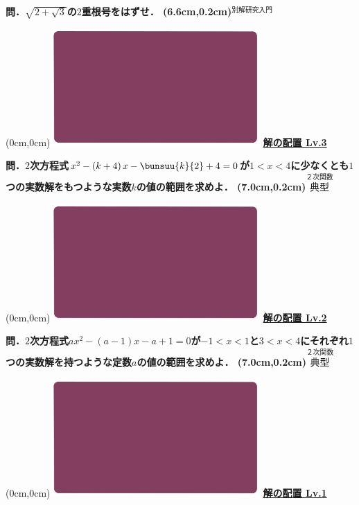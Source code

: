 \documentclass[10pt,
fleqn,
dvipdfmx,
uplatex
]{jsarticle}
\begin{document}
\HUGE 
\bf\boldmath 問．$\sqrt {2+\sqrt 3}$の$2$重根号をはずせ．
\at(6.6cm,0.2cm){\small\color{bradorange}$\overset{\text{別解研究入門}}{\text{}}$}


\newpage



\at(0cm,0cm){\includegraphics[width=8cm,bb=0 0 1920 1080]{./youtube/thumbnails/templates/smart_background/２次関数.jpeg}}
{\color{orange}\bf\boldmath\huge\underline{解の配置 Lv.3 }}\vspace{0.3zw}

\LARGE 
\bf\boldmath 問．$2$次方程式$x^2-\left(k+4\right)x-\bunsuu{k}{2}+4=0$が$1<x<4$に少なくとも$1$つの実数解をもつような実数$k$の値の範囲を求めよ．
\at(7.0cm,0.2cm){\small\color{bradorange}$\overset{\text{２次関数}}{\text{典型}}$}


\newpage



\at(0cm,0cm){\includegraphics[width=8cm,bb=0 0 1920 1080]{./youtube/thumbnails/templates/smart_background/２次関数.jpeg}}
{\color{orange}\bf\boldmath\huge\underline{解の配置 Lv.2 }}\vspace{0.3zw}

\LARGE 
\bf\boldmath 問．$2$次方程式$ax^2-\left(a-1\right)x-a+1=0$が$-1<x<1$と$3<x<4$にそれぞれ$1$つの実数解を持つような定数$a$の値の範囲を求めよ．
\at(7.0cm,0.2cm){\small\color{bradorange}$\overset{\text{２次関数}}{\text{典型}}$}


\newpage



\at(0cm,0cm){\includegraphics[width=8cm,bb=0 0 1920 1080]{./youtube/thumbnails/templates/smart_background/２次関数.jpeg}}
{\color{orange}\bf\boldmath\huge\underline{解の配置 Lv.1 }}\vspace{0.3zw}
\end{document}
